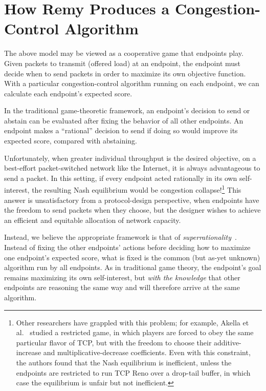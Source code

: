 \section{How Remy Produces a Congestion-Control Algorithm}
\label{s:design}

The above model may be viewed as a cooperative game that endpoints play. Given
packets to transmit (offered load) at an endpoint, the endpoint must
decide when to send packets in order to maximize its own objective
function. With a particular congestion-control algorithm running on
each endpoint, we can calculate each endpoint's expected score.

In the traditional game-theoretic framework, an endpoint's decision to
send or abstain can be evaluated after fixing the behavior of all
other endpoints. An endpoint makes a ``rational'' decision to send if
doing so would improve its expected score, compared with abstaining.

Unfortunately, when greater individual throughput is the desired
objective, on a best-effort packet-switched network like the Internet,
it is always advantageous to send a packet. In this setting, if every
endpoint acted rationally in its own self-interest, the resulting Nash
equilibrium would be congestion collapse!\footnote{Other researchers
  have grappled with this problem; for example, Akella et
  al.~\cite{Akella02} studied a restricted game, in which players are
  forced to obey the same particular flavor of TCP, but with the freedom
  to choose their additive-increase and multiplicative-decrease
  coefficients. Even with this constraint, the authors found that the Nash
  equilibrium is inefficient, unless the endpoints are restricted to
  run TCP Reno over a drop-tail buffer, in which case the equilibrium
  is unfair but not inefficient.}  This answer is unsatisfactory from
a protocol-design perspective, when endpoints have the freedom to send
packets when they choose, but the designer wishes to achieve an
efficient and equitable allocation of network capacity.

Instead, we believe the appropriate framework is that of {\em
  superrationality}~\cite{hofstadter1985metamagical}. Instead of
fixing the other endpoints' actions before deciding how to maximize
one endpoint's expected score, what is fixed is the common (but as-yet
unknown) algorithm run by all endpoints. As in traditional game
theory, the endpoint's goal remains maximizing its own self-interest,
but {\em with the knowledge} that other endpoints are reasoning the
same way and will therefore arrive at the same algorithm.

